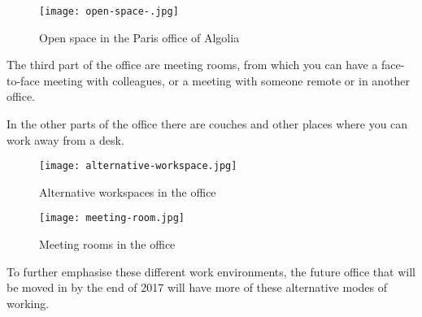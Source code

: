 \begin{figure}[H]
  \centering
  \texttt{[image: open-space-.jpg]}
  \caption{Open space in the Paris office of Algolia}
  \label{figure:algolia-open-space}
\end{figure}

The third part of the office are meeting rooms, from which you can have a face-to-face meeting with colleagues, or a meeting with someone remote or in another office.

In the other parts of the office there are couches and other places where you can work away from a desk.

\begin{figure}[H]
\centering
\begin{minipage}{.5\textwidth}
  \centering
  \texttt{[image: alternative-workspace.jpg]}
  \caption{Alternative workspaces in the office}
  \label{figure:algolia-alternative-space}
\end{minipage}%
\begin{minipage}{.5\textwidth}
  \centering
  \texttt{[image: meeting-room.jpg]}
  \caption{Meeting rooms in the office}
  \label{figure:algolia-meeting-rooms}
\end{minipage}
\end{figure}

To further emphasise these different work environments, the future office that will be moved in by the end of 2017 will have more of these alternative modes of working. %

